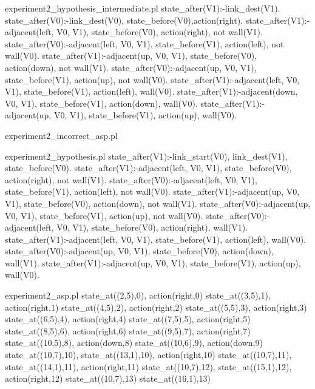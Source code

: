 \begin{filecontents*}{experiment2_hypothesis_intermediate.pl}
state_after(V1):-link_dest(V1).
state_after(V0):-link_dest(V0), state_before(V0),action(right).
state_after(V1):-adjacent(left, V0, V1), state_before(V0), 
                 action(right), not wall(V1).
state_after(V0):-adjacent(left, V0, V1), state_before(V1), 
                 action(left), not wall(V0).
state_after(V1):-adjacent(up, V0, V1), state_before(V0), 
                 action(down), not wall(V1).
state_after(V0):-adjacent(up, V0, V1), state_before(V1), 
                 action(up), not wall(V0).
state_after(V1):-adjacent(left, V0, V1), state_before(V1), 
                 action(left), wall(V0).
state_after(V1):-adjacent(down, V0, V1), state_before(V1), 
                 action(down), wall(V0).
state_after(V1):-adjacent(up, V0, V1), state_before(V1), 
                 action(up), wall(V0).
\end{filecontents*}

\begin{filecontents*}{experiment2_incorrect_asp.pl}

\end{filecontents*}

\begin{filecontents*}{experiment2_hypothesis.pl}
state_after(V1):-link_start(V0), link_dest(V1), 
                 state_before(V0).
state_after(V1):-adjacent(left, V0, V1), state_before(V0),
                 action(right), not wall(V1).
state_after(V0):-adjacent(left, V0, V1), state_before(V1),
                 action(left), not wall(V0).
state_after(V1):-adjacent(up, V0, V1), state_before(V0),
                 action(down), not wall(V1).
state_after(V0):-adjacent(up, V0, V1), state_before(V1),
                 action(up), not wall(V0).
state_after(V0):-adjacent(left, V0, V1), state_before(V0),
                 action(right), wall(V1).
state_after(V1):-adjacent(left, V0, V1), state_before(V1),
                 action(left), wall(V0).
state_after(V0):-adjacent(up, V0, V1), state_before(V0),
                 action(down), wall(V1).
state_after(V1):-adjacent(up, V0, V1), state_before(V1),
                 action(up), wall(V0).
\end{filecontents*}

\begin{filecontents*}{experiment2_asp.pl}
state_at((2,5),0), action(right,0)
state_at((3,5),1), action(right,1)
state_at((4,5),2), action(right,2)
state_at((5,5),3), action(right,3)
state_at((6,5),4), action(right,4)
state_at((7,5),5), action(right,5)
state_at((8,5),6), action(right,6)
state_at((9,5),7), action(right,7)
state_at((10,5),8), action(down,8)
state_at((10,6),9), action(down,9)
state_at((10,7),10), state_at((13,1),10), action(right,10)
state_at((10,7),11), state_at((14,1),11), action(right,11)
state_at((10,7),12), state_at((15,1),12), action(right,12)
state_at((10,7),13)
state_at((16,1),13)
\end{filecontents*}

